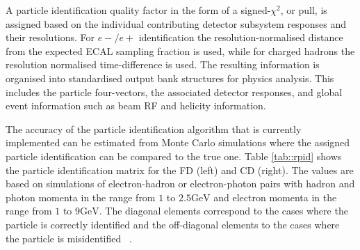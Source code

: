     A particle identification quality factor in the form of a signed-$\chi^2$, or pull, is assigned based on the individual contributing detector subsystem responses and their resolutions.
    For $e-/e+$ identification the resolution-normalised distance from the expected ECAL sampling fraction is used, while for charged hadrons the resolution normalised time-difference is used.
    The resulting information is organised into standardised output bank structures for physics analysis.
    This includes the particle four-vectors, the associated detector responses, and global event information such as beam RF and helicity information.

    The accuracy of the particle identification algorithm that is currently implemented can be estimated from Monte Carlo simulations where the assigned particle identification can be compared to the true one.
    Table \ref{tab::rpid} shows the particle identification matrix for the FD (left) and CD (right).
    The values are based on simulations of electron-hadron or electron-photon pairs with hadron and photon momenta in the range from $1$ to $2.5 \text{GeV}$ and electron momenta in the range from $1$ to $9 \text{GeV}$.
    The diagonal elements correspond to the cases where the particle is correctly identified and the off-diagonal elements to the cases where the particle is misidentified ~\cite{ziegler2020}.

